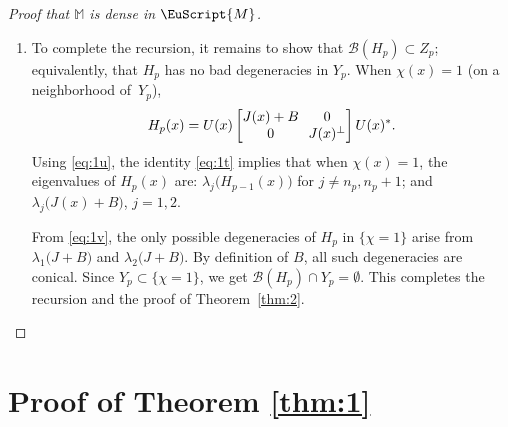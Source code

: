 \documentclass[10pt]{amsart}
\let\mathcal\mathscr
\let\pazocal\EuScript
\theoremstyle{definition}
\newcommand{\MM}{\pazocal{M}}
\newcommand{\BB}{\mathcal{B}}
\newcommand{\Mm}{\mathbb{M}}
\let\epsi\varepsilon
\newcommand{\matrice}[1]{\arraycolsep3.5pt\begin{bmatrix}#1\end{bmatrix}}
\begin{document}
\begin{proof}[Proof that $\Mm$ is dense in $\MM$]
\begin{enumerate}
The recursion assumption $d(H,H_{p-1}) \leq (1-2^{-p-1}) \epsi$ and $d(H_p,H_{p-1}) \leq 2^{-p} \epsi$ yield $d(H, H_p) \leq \bigl(1-2^{-p}\bigr) \epsi$. Moreover, $d(H_p,H_{p-1}) \leq \eta_0/8$ implies $\| H_p - H_{p-1} \|_{C^2} \leq \eta_0$. From Lemma \ref{lem:1c} and the recursion assumption $\BB(H_{p-1}) \subset Z_{p-1}$, $\BB(H_p) \subset Z_{p-1}$.

\item
To complete the recursion, it remains to show that $\BB(H_p) \subset Z_p$; equivalently, that $H_p$ has no bad degeneracies in $Y_p$. When $\chi(x) = 1$ (\ie on a neighborhood of~$Y_p$),
\begin{equation}\label{eq:1t}
H_p(x) = U(x) \matrice{J(x) + B & 0 \\ 0 & J(x)^\perp}U(x)^*.
\end{equation}
Using \eqref{eq:1u}, the identity \eqref{eq:1t} implies that when $\chi(x)=1$, the eigenvalues of $H_p(x)$ are: $\lambda_j\bigl( H_{p-1}(x) \bigr)$ for $j \neq n_p, n_p+1$; and $\lambda_j\bigl( J(x) + B \bigr)$, $j =1,2$.

From \eqref{eq:1v}, the only possible degeneracies of $H_p$ in $\{ \chi = 1 \}$ arise from $\lambda_1\bigl( J + B \bigr)$ and $\lambda_2\bigl( J + B \bigr)$. By definition of $B$, all such degeneracies are conical. Since $Y_p \subset \{ \chi=1\}$, we get $\BB(H_p) \cap Y_p = \emptyset$. This completes the recursion and the proof of Theorem~\ref{thm:2}.\qedhere
\end{enumerate}
\end{proof}

\section{Proof of Theorem \ref{thm:1}}\label{sec:4}
\end{document}
